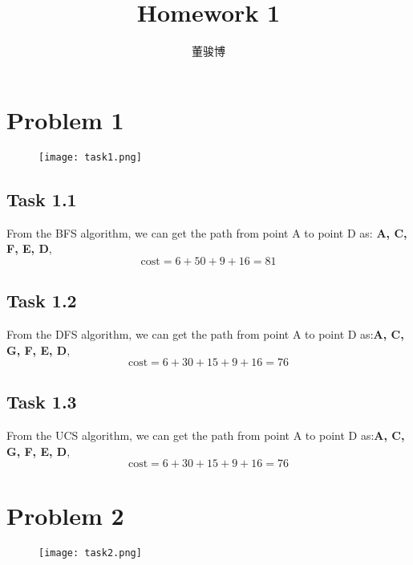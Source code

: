 \documentclass[onecolumn,oneside]{SUSTechHomework}
\author{董骏博}
\title{Homework 1}
\begin{document}
    \maketitle
  
    \section*{Problem 1}
    \begin{figure}[h]
        \centering
        \texttt{[image: task1.png]} %
        \label{fig:example} %
    \end{figure}

    \subsection*{Task 1.1}
    From the BFS algorithm, we can get the path from point A to point D as: \textbf{A, C, F, E, D},\[\text{cost} = 6 + 50 + 9 + 16 = 81 \]

    \subsection*{Task 1.2}
    From the DFS algorithm, we can get the path from point A to point D as:\textbf{A, C, G, F, E, D},\[\text{cost} = 6 + 30 + 15 + 9 + 16 = 76 \]

    \subsection*{Task 1.3}
    From the UCS algorithm, we can get the path from point A to point D as:\textbf{A, C, G, F, E, D},\[\text{cost} = 6 + 30 + 15 + 9 + 16 = 76 \]

    \newpage
    \section*{Problem 2}
    \begin{figure}[h]
        \centering
        \texttt{[image: task2.png]} %
        \label{fig:example} %
    \end{figure}
\end{document}
